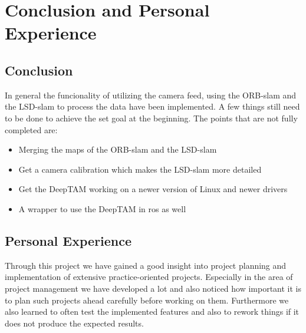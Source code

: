 



\chapter{Conclusion and Personal Experience}


\section{Conclusion}

In general the funcionality of utilizing the camera feed, using the ORB-\gls{slam} and the LSD-\gls{slam} to process the data have been implemented. A few things still need to be done to achieve the set goal at the beginning. The points that are not fully completed are:
\begin{itemize}
    \item
    Merging the maps of the ORB-\gls{slam} and the LSD-\gls{slam}
    
    \item
    Get a camera calibration which makes the LSD-\gls{slam} more detailed
    
    \item
    Get the DeepTAM working on a newer version of Linux and newer drivers
    
    \item
    A wrapper to use the DeepTAM in \gls{ros} as well
\end{itemize}
\section{Personal Experience}

Through this project we have gained a good insight into project planning and implementation of extensive practice-oriented projects. Especially in the area of project management we have developed a lot and also noticed how important it is to plan such projects ahead carefully before working on them. Furthermore we also learned to often test the implemented features and also to rework things if it does not produce the expected results. \newline

